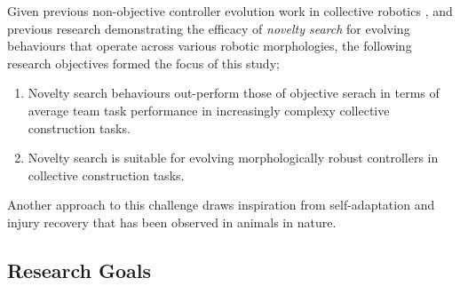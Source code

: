 

Given previous non-objective controller evolution work in collective robotics
\cite{gomes2013generic}
\cite{RefWorks:5}
\cite{RefWorks:11},
and previous research demonstrating the efficacy of \textit{novelty search} \cite{lehman2011abandoning} for evolving behaviours that operate across various robotic morphologies, the following research objectives formed the focus of this study;

\begin{enumerate}
	\item Novelty search behaviours out-perform those of objective serach in terms of average team task performance in increasingly complexy collective construction tasks.
	\item Novelty search is suitable for evolving morphologically robust controllers in collective construction tasks.
\end{enumerate}


Another approach to this challenge draws inspiration from self-adaptation and injury recovery that has been observed in animals in nature.







\subsection{Research Goals}

